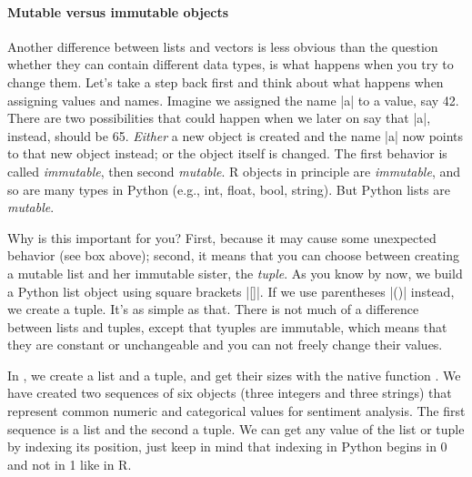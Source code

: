 \paragraph{Mutable versus immutable objects}

Another difference between lists and vectors is less obvious than
the question whether they can contain different data types, is what happens when you try to change them.
Let's take a step back first and think about what happens when assigning values
and names.
Imagine we assigned the name |a| to a value, say 42.
There are two possibilities that could happen when we later on say that |a|,
instead, should be 65. \emph{Either} a new object is created and the name |a|
now points to that new object instead; or the object itself is changed.
The first behavior is called \emph{immutable}, then second \emph{mutable}.
R objects in principle are \emph{immutable}, and so are many types
in Python (e.g., int, float, bool, string). But Python lists are \emph{mutable}.



Why is this important for you? First, because it may cause some
unexpected behavior (see box above); second, it means that you can
choose between creating a mutable list and her immutable sister, the \emph{tuple}.
As you know by now, we build a Python list object using square brackets |[]|. If we use
parentheses |()| instead, we create a tuple. It's as simple as that.
There is not much of a difference between lists and tuples, except that tyuples are immutable, which means that
they are constant or unchangeable and you can not freely change their
values.

In , we create a list and a tuple, and get their sizes with the native function .
We have created two sequences of six objects
(three integers and three strings) that represent common numeric and
categorical values for sentiment analysis. The first sequence is a
list and the second a tuple. We can get any value of the list or tuple
by indexing its position, just keep in mind that indexing in Python
begins in 0 and not in 1 like in R. 

